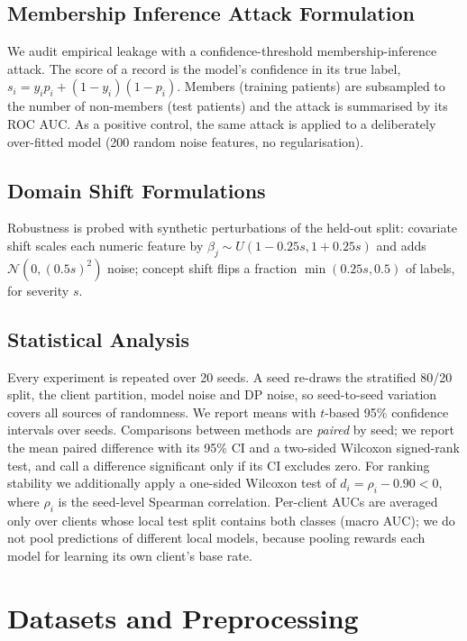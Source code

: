 \documentclass[journal]{IEEEtran}
\begin{document}
\subsection{Membership Inference Attack Formulation}
We audit empirical leakage with a confidence-threshold membership-inference attack. The score of a record is the model's confidence in its true label, $s_i = y_i p_i + (1 - y_i)(1 - p_i)$. Members (training patients) are subsampled to the number of non-members (test patients) and the attack is summarised by its ROC AUC. As a positive control, the same attack is applied to a deliberately over-fitted model (200 random noise features, no regularisation).

\subsection{Domain Shift Formulations}
Robustness is probed with synthetic perturbations of the held-out split: covariate shift scales each numeric feature by $\beta_j \sim U(1-0.25s, 1+0.25s)$ and adds $\mathcal{N}(0, (0.5s)^2)$ noise; concept shift flips a fraction $\min(0.25s, 0.5)$ of labels, for severity $s$.

\subsection{Statistical Analysis}
Every experiment is repeated over 20 seeds. A seed re-draws the stratified 80/20 split, the client partition, model noise and DP noise, so seed-to-seed variation covers all sources of randomness. We report means with $t$-based 95\% confidence intervals over seeds. Comparisons between methods are \emph{paired} by seed; we report the mean paired difference with its 95\% CI and a two-sided Wilcoxon signed-rank test, and call a difference significant only if its CI excludes zero. For ranking stability we additionally apply a one-sided Wilcoxon test of $d_i = \rho_i - 0.90 < 0$, where $\rho_i$ is the seed-level Spearman correlation. Per-client AUCs are averaged only over clients whose local test split contains both classes (macro AUC); we do not pool predictions of different local models, because pooling rewards each model for learning its own client's base rate.

\section{Datasets and Preprocessing}
\label{sec:data}
\end{document}
